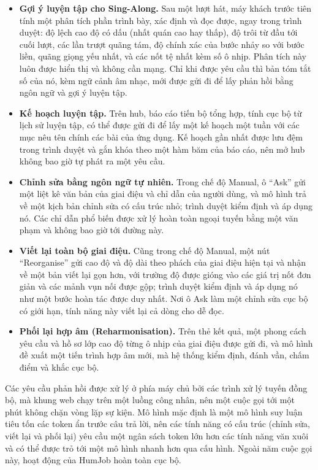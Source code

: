 \documentclass[12pt,a4paper]{article}
\begin{document}
\begin{itemize}
    \item \textbf{Gợi ý luyện tập cho Sing-Along.} Sau một lượt hát, máy khách trước
    tiên tính một phân tích phần trình bày, xác định và đọc được, ngay trong trình
    duyệt: độ lệch cao độ có dấu (nhất quán cao hay thấp), độ trôi từ đầu tới cuối
    lượt, các lần trượt quãng tám, độ chính xác của bước nhảy so với bước liền,
    quãng giọng yếu nhất, và các nốt tệ nhất kèm số ô nhịp. Phân tích này luôn được
    hiển thị và không cần mạng. Chỉ khi được yêu cầu thì bản tóm tắt số của nó, kèm
    ngữ cảnh âm nhạc, mới được gửi đi để lấy phản hồi bằng ngôn ngữ và gợi ý luyện
    tập.
    \item \textbf{Kế hoạch luyện tập.} Trên hub, báo cáo tiến bộ tổng hợp, tính cục
    bộ từ lịch sử luyện tập, có thể được gửi đi để lấy một kế hoạch một tuần với các
    mục nêu tên chính các bài của ứng dụng. Kế hoạch gần nhất được lưu đệm trong
    trình duyệt và gắn khóa theo một hàm băm của báo cáo, nên mở hub không bao giờ
    tự phát ra một yêu cầu.
    \item \textbf{Chỉnh sửa bằng ngôn ngữ tự nhiên.} Trong chế độ Manual, ô ``Ask''
    gửi một liệt kê văn bản của giai điệu và chỉ dẫn của người dùng, và mô hình trả
    về một kịch bản chỉnh sửa có cấu trúc nhỏ; trình duyệt kiểm định và áp dụng nó.
    Các chỉ dẫn phổ biến được xử lý hoàn toàn ngoại tuyến bằng một văn phạm và không
    bao giờ tới đường này.
    \item \textbf{Viết lại toàn bộ giai điệu.} Cũng trong chế độ Manual, một nút
    ``Reorganise'' gửi cao độ và độ dài theo phách của giai điệu hiện tại và nhận về
    một bản viết lại gọn hơn, với trường độ được gióng vào các giá trị nốt đơn giản
    và các mảnh vụn nối được gộp; trình duyệt kiểm định và áp dụng nó như một bước
    hoàn tác được duy nhất. Nơi ô Ask làm một chỉnh sửa cục bộ có giới hạn, tính năng
    này viết lại cả dòng cho dễ đọc.
    \item \textbf{Phối lại hợp âm (Reharmonisation).} Trên thẻ kết quả, một phong
    cách yêu cầu và hồ sơ lớp cao độ từng ô nhịp của giai điệu được gửi đi, và mô
    hình đề xuất một tiến trình hợp âm mới, mà hệ thống kiểm định, đánh vần, chấm
    điểm và khắc cục bộ.
\end{itemize}

Các yêu cầu phản hồi được xử lý ở phía máy chủ bởi các trình xử lý tuyến đồng bộ,
mà khung web chạy trên một luồng công nhân, nên một cuộc gọi tới một phút không chặn
vòng lặp sự kiện. Mô hình mặc định là một mô hình suy luận tiêu tốn các token ẩn
trước câu trả lời, nên các tính năng có cấu trúc (chỉnh sửa, viết lại và phối lại)
yêu cầu một ngân sách token lớn hơn các tính năng văn xuôi và có thể được trỏ tới
một mô hình nhanh hơn qua cấu hình. Ngoài năm cuộc gọi này, hoạt động của HumJob
hoàn toàn cục bộ.
\end{document}
